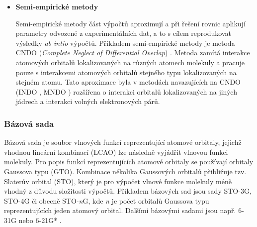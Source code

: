 \begin{itemize}
    \item \textbf{Semi-empirické metody}
    
    Semi-empirické metody část výpočtů aproximují a při řešení rovnic aplikují parametry odvozené z experimentálních dat, a to s cílem reprodukovat výsledky \textit{ab intio} výpočtů. Příkladem semi-empirické metody je metoda CNDO (\textit{Complete Neglect of Differential Overlap}) \cite{CNDO}. Metoda zamítá interakce atomových orbitalů lokalizovaných na různých atomech molekuly a pracuje pouze s interakcemi atomových orbitalů stejného typu lokalizovaných na stejném atomu. Tato aproximace byla v metodách navazujících na CNDO (INDO \cite{INDO}, MNDO \cite{MNDO}) rozšířena o interakci orbitalů lokalizovaných na jiných jádrech a interakci volných elektronových párů.
\end{itemize}


\subsubsection{Bázová sada}
Bázová sada je soubor vlnových funkcí reprezentující atomové orbitaly, jejichž vhodnou lineární kombinací (LCAO) lze následně vyjádřit vlnovou funkci molekuly. %
Pro popis funkcí reprezentujících atomové orbitaly se používají orbitaly Gaussova typu (GTO). Kombinace několika Gaussových orbitalů přibližuje tzv. Slaterův orbital (STO), který je pro výpočet vlnové funkce molekuly méně vhodný z důvodu složitosti výpočtů. Příkladem bázových sad jsou sady STO-3G, STO-4G či obecně STO-\textit{n}G, kde \textit{n} je počet orbitalů Gaussova typu reprezentujících jeden atomový orbital. Dalšími bázovými sadami jsou např. 6-31G nebo 6-21G* \cite{basis_set}.

